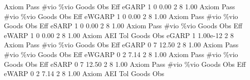        Axiom {\VBAR} Pass        \#vio        \%vio       Goods         Obs         Eff  
       eGARP {\VBAR}    1           0        0.00           2           8        1.00  
{\smallskip}
{\smallskip}
{\smallskip}
       Axiom {\VBAR} Pass        \#vio        \%vio       Goods         Obs         Eff  
      eWGARP {\VBAR}    1           0        0.00           2           8        1.00  
{\smallskip}
{\smallskip}
{\smallskip}
       Axiom {\VBAR} Pass        \#vio        \%vio       Goods         Obs         Eff  
       eSARP {\VBAR}    1           0        0.00           2           8        1.00  
{\smallskip}
{\smallskip}
{\smallskip}
       Axiom {\VBAR} Pass        \#vio        \%vio       Goods         Obs         Eff  
       eWARP {\VBAR}    1           0        0.00           2           8        1.00  
{\smallskip}
       Axiom {\VBAR}       AEI        Tol      Goods        Obs 
       eGARP {\VBAR}         1   1.00e-12          2          8 
{\smallskip}
{\smallskip}
{\smallskip}
       Axiom {\VBAR} Pass        \#vio        \%vio       Goods         Obs         Eff  
       eGARP {\VBAR}    0           7       12.50           2           8        1.00  
{\smallskip}
{\smallskip}
{\smallskip}
       Axiom {\VBAR} Pass        \#vio        \%vio       Goods         Obs         Eff  
      eWGARP {\VBAR}    0           2        7.14           2           8        1.00  
{\smallskip}
{\smallskip}
{\smallskip}
       Axiom {\VBAR} Pass        \#vio        \%vio       Goods         Obs         Eff  
       eSARP {\VBAR}    0           7       12.50           2           8        1.00  
{\smallskip}
{\smallskip}
{\smallskip}
       Axiom {\VBAR} Pass        \#vio        \%vio       Goods         Obs         Eff  
       eWARP {\VBAR}    0           2        7.14           2           8        1.00  
{\smallskip}
       Axiom {\VBAR}       AEI        Tol      Goods        Obs 

